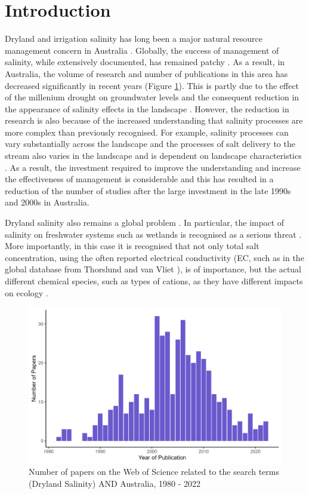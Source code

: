 \documentclass[, manuscript]{copernicus}
\begin{document}
\section{Introduction}

Dryland and irrigation salinity has long been a major natural resource
management concern in Australia
\citep{Jolly2001, White2009, Scanlon2007, Walker2002, Finlayson2010}.
Globally, the success of management of salinity, while extensively
documented, has remained patchy \citep{Leblanc2012}. As a result, in
Australia, the volume of research and number of publications in this
area has decreased significantly in recent years (Figure
\ref{fig:SalinityPapers}). This is partly due to the effect of the
millenium drought on groundwater levels and the consequent reduction in
the appearance of salinity effects in the landscape
\citep{mcfarlane2016}. However, the reduction in research is also
because of the increased understanding that salinity processes are more
complex than previously recognised. For example, salinity processes can
vary substantially across the landscape \citep{Conyers2008} and the
processes of salt delivery to the stream also varies in the landscape
\citep{Summerell2006, Hughes2007} and is dependent on landscape
characteristics \citep{vanDijk2008, Dalhaus2010}. As a result, the
investment required to improve the understanding and increase the
effectiveness of management is considerable and this has resulted in a
reduction of the number of studies after the large investment in the
late 1990s and 2000s in Australia.

Dryland salinity also remains a global problem
\citep{thorslund_vanvliet2020, stavi2021, mcfarlane2016}. In particular,
the impact of salinity on freshwater systems such as wetlands is
recognised as a serious threat \citep{canedoarguelles2016_science}. More
importantly, in this case it is recognised that not only total salt
concentration, using the often reported electrical conductivity (EC,
such as in the global database from Thorslund and van Vliet
\citeyearpar{thorslund_vanvliet2020}), is of importance, but the actual
different chemical species, such as types of cations, as they have
different impacts on ecology \citep{canedoarguelles2016_science}.

\begin{figure}
\includegraphics[width=0.8\linewidth]{Figures/Dryland Salinity Papers} \caption{Number of papers on the Web of Science related to the search terms (Dryland Salinity) AND Australia, 1980 - 2022}\label{fig:SalinityPapers}
\end{figure}
\end{document}

